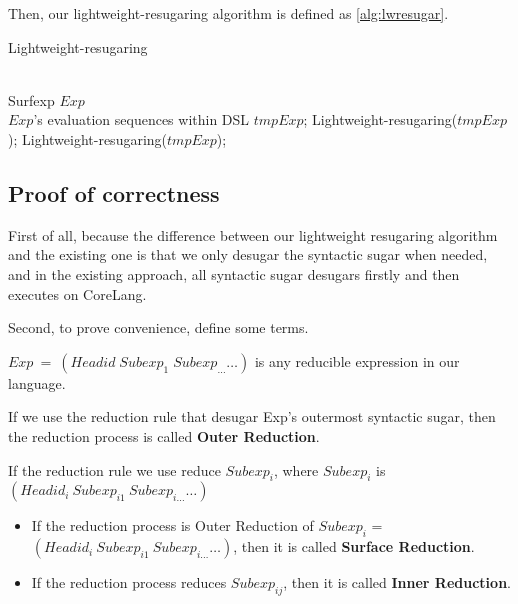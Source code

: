 Then, our lightweight-resugaring algorithm is defined as \ref{alg:lwresugar}.

\begin{algorithm}
	\caption{Lightweight-resugaring}
	\label{alg:lwresugar}     %
	\begin{algorithmic}[1]       %
		\REQUIRE ~~\\      %
		Surfexp $Exp$
		\ENSURE ~~\\     %
		$Exp$'s evaluation sequences within DSL
		\RETURN
		\PRINT $tmpExp$;
		\STATE Lightweight-resugaring($tmpExp$);
		\ELSE 
		\STATE Lightweight-resugaring($tmpExp$);
		\ENDIF
		\ENDWHILE
		
	\end{algorithmic}
\end{algorithm}

\subsection{Proof of correctness}

First of all, because the difference between our lightweight resugaring algorithm and the existing one is that we only desugar the syntactic sugar when needed, and in the existing approach, all syntactic sugar desugars firstly and then executes on CoreLang.

Second, to prove convenience, define some terms.

$Exp~=~(Headid\;Subexp_{1}\;Subexp_{\ldots} \ldots)$ is any reducible expression in our language.

If we use the reduction rule that desugar Exp's outermost syntactic sugar, then the reduction process is called {\bfseries Outer Reduction}.

If the reduction rule we use reduce $Subexp_{i}$, where $Subexp_{i}$ is $(Headid_{i}~Subexp_{i1}~Subexp_{i\ldots} \ldots)$
\begin{itemize}
	\item If the reduction process is Outer Reduction of $Subexp_{i}$ = $(Headid_{i}~Subexp_{i1}~Subexp_{i\ldots} \ldots)$, then it is called {\bfseries Surface Reduction}.
	\item If the reduction process reduces $Subexp_{ij}$, then it is called {\bfseries Inner Reduction}.
\end{itemize}

